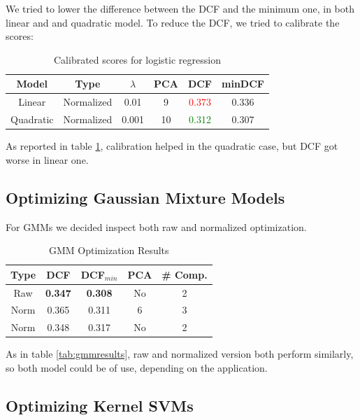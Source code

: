 \documentclass[12pt, twocolumn]{article}
\begin{document}
We tried to lower the difference between the DCF and the minimum one, in both linear and and quadratic model.
To reduce the DCF, we tried to calibrate the scores:

\begin{table}[H]
    \tiny
    \centering
        \begin{tabular}{||c|c|c|c|c|c||}
            \hline
            Model & Type & $\lambda$ & PCA & DCF & minDCF \\
            \hline
            \hline
            Linear & Normalized & 0.01 & 9 & \textcolor{red}{0.373} &  0.336  \\
            Quadratic & Normalized & 0.001 & 10 & \textcolor{green}{0.312} &  0.307  \\
            \hline
    \end{tabular}
    \caption{Calibrated scores for logistic regression}
    \label{logregcalibration}
\end{table}

As reported in table \ref{logregcalibration}, calibration helped in the quadratic case, 
but DCF got worse in linear one.

\subsection{Optimizing Gaussian Mixture Models}

For GMMs we decided inspect both raw and normalized optimization.

\begin{table}[H] 
    \centering
    \begin{tabular}{||c|c|c|c|c||}
        \hline
        Type & DCF & DCF$_{min}$ & PCA & \# Comp. \\
        \hline
        \hline
        Raw  & {\bf 0.347} & {\bf 0.308} & No & 2 \\
        Norm & 0.365 & 0.311 & 6  & 3 \\
        Norm & 0.348 & 0.317 & No & 2 \\
        \hline
    \end{tabular}
    \caption{GMM Optimization Results}
    \label{tab:gmmoptimization}
\end{table}

As in table \ref{tab:gmmresults}, raw and normalized version both perform similarly, so both model could be of use, depending on the application.

\subsection{Optimizing Kernel SVMs}
\end{document}
